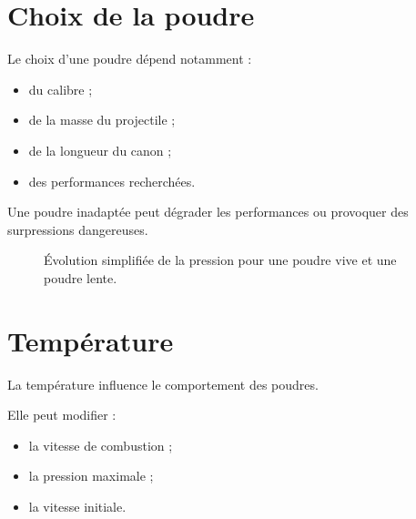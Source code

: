 \section{Choix de la poudre}

Le choix d'une poudre dépend notamment :

\begin{itemize}
    \item du calibre ;
    \item de la masse du projectile ;
    \item de la longueur du canon ;
    \item des performances recherchées.
\end{itemize}

Une poudre inadaptée peut dégrader les performances ou provoquer des
surpressions dangereuses.

\begin{figure}[htbp]
\centering


\caption{Évolution simplifiée de la pression pour une poudre vive et une poudre lente.}
\label{fig:vivacite_poudre}
\end{figure}

\section{Température}

La température influence le comportement des poudres.

Elle peut modifier :

\begin{itemize}
    \item la vitesse de combustion ;
    \item la pression maximale ;
    \item la vitesse initiale.
\end{itemize}


